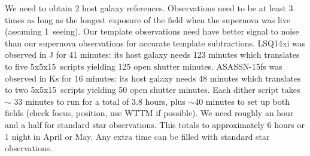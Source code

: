 \documentclass[11pt]{article}
\begin{document}

%



%

\technicaldescription

We need to obtain 2 host galaxy references. 
Observations need to be at least 3 times as long as the longest exposure of the field when the supernova was live (assuming 1\arcsec\ seeing).
Our template observations need have better signal to noise than our supernova observations for accurate template subtractions. 
LSQ14xi was observed in J for 41 minutes:  its host galaxy needs 123 minutes which translates to five 5x5x15\arcsec\ scripts yielding 125 open shutter minutes.
ASASSN-15fs was observed in Ks for 16 minutes: its host galaxy needs 48 minutes which translates to two 5x5x15\arcsec\ scripts yielding 50 open shutter minutes.
Each dither script takes $\sim$ 33 minutes to run for a total of 3.8 hours, plus $\sim40$ minutes to set up both fields (check focus, position, use WTTM if possible).
We need roughly an hour and a half for standard star observations.
This totals to approximately 6 hours or 1 night in April or May.
Any extra time can be filled with standard star observations.
\end{document}
